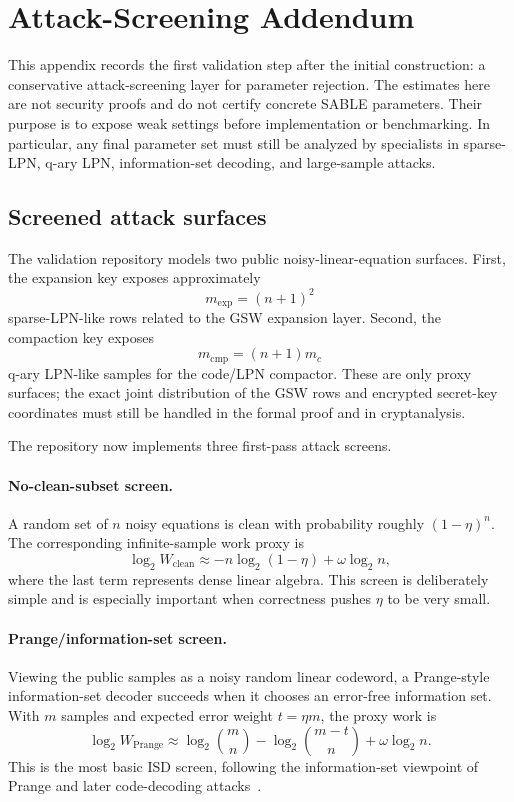 \section{Attack-Screening Addendum}
\label{app:attack-screening}

This appendix records the first validation step after the initial construction: a conservative attack-screening layer for parameter rejection.  The estimates here are not security proofs and do not certify concrete SABLE parameters.  Their purpose is to expose weak settings before implementation or benchmarking.  In particular, any final parameter set must still be analyzed by specialists in sparse-LPN, q-ary LPN, information-set decoding, and large-sample attacks.

\subsection{Screened attack surfaces}

The validation repository models two public noisy-linear-equation surfaces.  First, the expansion key exposes approximately
\[
  m_{\exp}=(n+1)^2
\]
sparse-LPN-like rows related to the GSW expansion layer.  Second, the compaction key exposes
\[
  m_{\mathrm{cmp}}=(n+1)m_c
\]
q-ary LPN-like samples for the code/LPN compactor.  These are only proxy surfaces; the exact joint distribution of the GSW rows and encrypted secret-key coordinates must still be handled in the formal proof and in cryptanalysis.

The repository now implements three first-pass attack screens.

\paragraph{No-clean-subset screen.}
A random set of $n$ noisy equations is clean with probability roughly $(1-\eta)^n$.  The corresponding infinite-sample work proxy is
\[
  \log_2 W_{\mathrm{clean}}
  \approx -n\log_2(1-\eta)+\omega\log_2 n,
\]
where the last term represents dense linear algebra.  This screen is deliberately simple and is especially important when correctness pushes $\eta$ to be very small.

\paragraph{Prange/information-set screen.}
Viewing the public samples as a noisy random linear codeword, a Prange-style information-set decoder succeeds when it chooses an error-free information set.  With $m$ samples and expected error weight $t=\eta m$, the proxy work is
\[
  \log_2 W_{\mathrm{Prange}}
  \approx
  \log_2 {m\choose n} - \log_2 {m-t\choose n} + \omega\log_2 n.
\]
This is the most basic ISD screen, following the information-set viewpoint of Prange and later code-decoding attacks~\cite{Prange1962,Stern1989,BerlekampMcEliecevanTilborg1978}.


